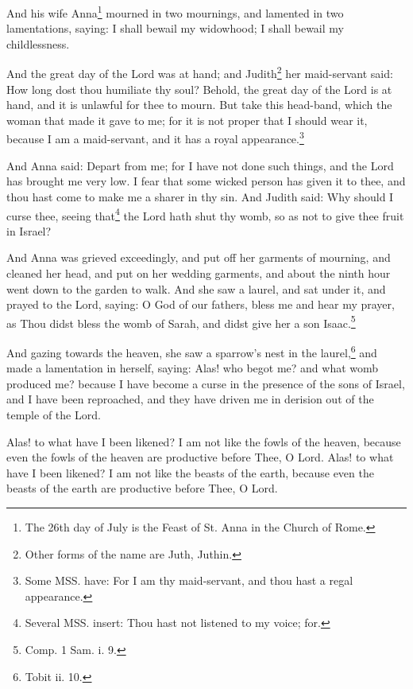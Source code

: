 \pend\pstart
{}

\pend\setcounter{pstartR}{1}\pstart
And his wife Anna\footnote{The 26th day of July is the Feast of St. Anna in the Church of Rome.} mourned in two mournings, and lamented in two lamentations, saying: I shall bewail my widowhood; I shall bewail my childlessness.

\pend\pstart
And the great day of the Lord was at hand; and Judith\footnote{Other forms of the name are Juth, Juthin.} her maid-servant said: How long dost thou humiliate thy soul? Behold, the great day of the Lord is at hand, and it is unlawful for thee to mourn. But take this head-band, which the woman that made it gave to me; for it is not proper that I should wear it, because I am a maid-servant, and it has a royal appearance.\footnote{Some MSS. have: For I am thy maid-servant, and thou hast a regal appearance.}

\pend\pstart
And Anna said: Depart from me; for I have not done such things, and the Lord has brought me very low. I fear that some wicked person has given it to thee, and thou hast come to make me a sharer in thy sin. And Judith said: Why should I curse thee, seeing that\footnote{Several MSS. insert: Thou hast not listened to my voice; for.} the Lord hath shut thy womb, so as not to give thee fruit in Israel?

\pend\pstart
And Anna was grieved exceedingly, and put off her garments of mourning, and cleaned her head, and put on her wedding garments, and about the ninth hour went down to the garden to walk. And she saw a laurel, and sat under it, and prayed to the Lord, saying: O God of our fathers, bless me and hear my prayer, as Thou didst bless the womb of Sarah, and didst give her a son Isaac.\footnote{Comp. 1 Sam. i. 9.}

\pend\pstart
{}

\pend\setcounter{pstartR}{1}\pstart
And gazing towards the heaven, she saw a sparrow's nest in the laurel,\footnote{Tobit ii. 10.} and made a lamentation in herself, saying: Alas! who begot me? and what womb produced me? because I have become a curse in the presence of the sons of Israel, and I have been reproached, and they have driven me in derision out of the temple of the Lord.

\pend\pstart
Alas! to what have I been likened? I am not like the fowls of the heaven, because even the fowls of the heaven are productive before Thee, O Lord. Alas! to what have I been likened? I am not like the beasts of the earth, because even the beasts of the earth are productive before Thee, O Lord.

